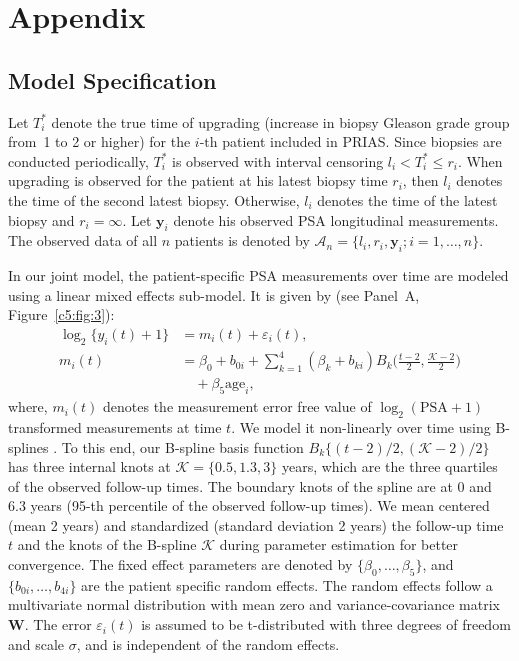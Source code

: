 \section*{Appendix}
\begin{subappendices}

\section{Model Specification}
\label{c5:appendix:model_specification}
Let $T_i^*$ denote the true time of upgrading (increase in biopsy Gleason grade group from~1 to 2 or higher) for the ${i\mbox{-th}}$ patient included in PRIAS. Since biopsies are conducted periodically, $T_i^*$ is observed with interval censoring ${l_i < T_i^* \leq r_i}$. When upgrading is observed for the patient at his latest biopsy time $r_i$, then $l_i$ denotes the time of the second latest biopsy. Otherwise, $l_i$ denotes the time of the latest biopsy and ${r_i=\infty}$. Let $\boldsymbol{y}_{i}$ denote his observed PSA longitudinal measurements. The observed data of all $n$ patients is denoted by ${\mathcal{A}_n = \{l_i, r_i, \boldsymbol{y}_{i}; i = 1, \ldots, n\}}$.

In our joint model, the patient-specific PSA measurements over time are modeled using a linear mixed effects sub-model. It is given by (see Panel~A, Figure~\ref{c5:fig:3}):
\begin{equation}
\label{c5:eq:long_model_psa}
\begin{split}
    \log_2 \big\{y_{i}(t) + 1\big\} &= m_{i}(t) + \varepsilon_{i}(t),\\
    m_{i}(t) &= \beta_{0} + b_{0i} + \sum_{k=1}^4 (\beta_{k} + b_{ki})  B_k\Big(\frac{t-2}{2},\frac{\mathcal{K}-2}{2}\Big)\\
    & \quad + \beta_{5} \mbox{age}_i,
    \end{split}
\end{equation}
where, $m_{i}(t)$ denotes the measurement error free value of $\log_2 (\mbox{PSA} + 1)$ transformed \citep{pearson1994mixed,lin2000latent} measurements at time $t$. We model it non-linearly over time using B-splines \citep{de1978practical}. To this end, our B-spline basis function ${B_k\{(t-2)/2,(\mathcal{K}-2)/2\}}$ has three internal knots at $\mathcal{K} = \{0.5, 1.3, 3\}$ years, which are the three quartiles of the observed follow-up times. The boundary knots of the spline are at 0 and 6.3 years (95-th percentile of the observed follow-up times). We mean centered (mean 2 years) and standardized (standard deviation 2 years) the follow-up time $t$ and the knots of the B-spline $\mathcal{K}$ during parameter estimation for better convergence. The fixed effect parameters are denoted by ${\{\beta_{0},\ldots,\beta_{5}\}}$, and ${\{b_{0i}, \ldots, b_{4i}\}}$ are the patient specific random effects. The random effects follow a multivariate normal distribution with mean zero and variance-covariance matrix $\boldsymbol{W}$. The error $\varepsilon_{i}(t)$ is assumed to be t-distributed with three degrees of freedom and scale $\sigma$, and is independent of the random effects. 


\end{subappendices}
